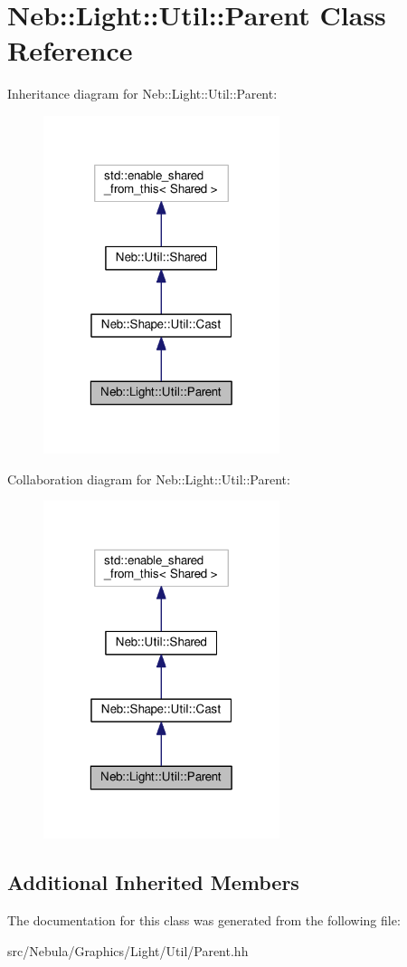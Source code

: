 \hypertarget{classNeb_1_1Light_1_1Util_1_1Parent}{\section{Neb\-:\-:Light\-:\-:Util\-:\-:Parent Class Reference}
\label{classNeb_1_1Light_1_1Util_1_1Parent}
}


Inheritance diagram for Neb\-:\-:Light\-:\-:Util\-:\-:Parent\-:
\nopagebreak
\begin{figure}[H]
\begin{center}
\leavevmode
\includegraphics[width=196pt]{classNeb_1_1Light_1_1Util_1_1Parent__inherit__graph}
\end{center}
\end{figure}


Collaboration diagram for Neb\-:\-:Light\-:\-:Util\-:\-:Parent\-:
\nopagebreak
\begin{figure}[H]
\begin{center}
\leavevmode
\includegraphics[width=196pt]{classNeb_1_1Light_1_1Util_1_1Parent__coll__graph}
\end{center}
\end{figure}
\subsection*{Additional Inherited Members}


The documentation for this class was generated from the following file\-:\begin{DoxyCompactItemize}
\item 
src/\-Nebula/\-Graphics/\-Light/\-Util/Parent.\-hh\end{DoxyCompactItemize}
